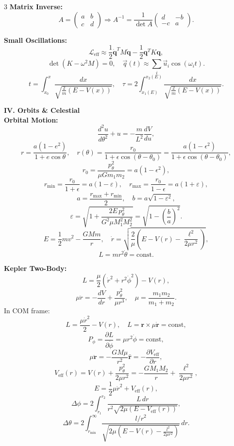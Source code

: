 \documentclass[1pt]{article}
\begin{document}
\begin{multicols}{3}
\textbf{Matrix Inverse:} 
\[
A=\begin{pmatrix} a&b\\c&d \end{pmatrix}
\Rightarrow A^{-1}=\frac{1}{\det A}\begin{pmatrix} d&-b\\-c&a \end{pmatrix}.
\]

\textbf{Small Oscillations:} 
\[
\mathcal{L}_{\text{eff}}\approx\frac{1}{2}\dot{\mathbf{q}}^T M\dot{\mathbf{q}}
-\frac{1}{2}\mathbf{q}^T K\mathbf{q},
\]
\[
\det(K-\omega^2M)=0,\quad
\vec{q}(t)\approx\sum_i\vec{u}_i\cos(\omega_it).
\]
\[
t=\int_{x_0}^{x}\frac{dx}{\sqrt{\frac{2}{m}(E-V(x))}},\quad
\tau=2\int_{x_1(E)}^{x_2(E)}\frac{dx}{\sqrt{\frac{2}{m}(E-V(x))}}.
\]

\textbf{IV. Orbits \& Celestial}\\[2pt]
\textbf{Orbital Motion:} 
\[
\frac{d^2u}{d\theta^2}+u=-\frac{m}{L^2}\frac{dV}{du},
\]
\[
r=\frac{a(1-e^2)}{1+e\cos\theta},
\quad
r(\theta)=\frac{r_0}{1+\epsilon\cos(\theta-\theta_0)}
=\frac{a(1-\epsilon^2)}{1+\epsilon\cos(\theta-\theta_0)},
\]
\[
r_0=\frac{p_\theta^2}{\mu Gm_1m_2}=a(1-\epsilon^2),
\]
\[
r_{\min}=\frac{r_0}{1+\epsilon}=a(1-\varepsilon),\quad
r_{\max}=\frac{r_0}{1-\epsilon}=a(1+\varepsilon),
\]
\[
a=\frac{r_{\max}+r_{\min}}{2},\quad b=a\sqrt{1-\varepsilon^2},
\]
\[
\varepsilon=\sqrt{1+\frac{2E\,p_\theta^2}{G^2\mu M_1^2M_2^2}}
=\sqrt{1-\left(\frac{b}{a}\right)^2}.
\]
\[
E=\frac{1}{2}mv^2-\frac{GMm}{r},\quad
\dot{r}=\sqrt{\frac{2}{\mu}\left(E-V(r)-\frac{\ell^2}{2\mu r^2}\right)},
\]
\[
L=mr^2\dot{\theta}=\text{const.}
\]

\textbf{Kepler Two-Body:} 
\[
L=\frac{\mu}{2}\left(\dot{r}^2+r^2\dot{\phi}^2\right)-V(r),
\]
\[
\mu\ddot{r}=-\frac{dV}{dr}+\frac{p_\theta^2}{\mu r^3},\quad
\mu=\frac{m_1m_2}{m_1+m_2}.
\]
In COM frame:
\[
L=\frac{\mu\dot{r}^2}{2}-V(r),
\quad
L=\mathbf{r}\times\mu\dot{\mathbf{r}}=\text{const},
\]
\[
P_\phi=\frac{\partial L}{\partial\dot{\phi}}=\mu r^2\dot{\phi}=\text{const},
\]
\[
\mu\ddot{\mathbf{r}}=-\frac{GM\mu}{r^2}\hat{\mathbf{r}}
=-\frac{\partial V_{\text{eff}}}{\partial r},
\]
\[
V_{\text{eff}}(r)=V(r)+\frac{p_\theta^2}{2\mu r^2}
=-\frac{GM_1M_2}{r}+\frac{\ell^2}{2\mu r^2},
\]
\[
E=\frac{1}{2}\mu\dot{r}^2+V_{\text{eff}}(r),
\]
\[
\Delta\phi=2\int_{r_1}^{r_2}\frac{L\,dr}{r^2\sqrt{2\mu(E-V_{\text{eff}}(r))}},
\]
\[
\Delta\theta=2\int_{r_{\min}}^{\infty}\frac{l/r^2}{\sqrt{2\mu\left(E-V(r)-\frac{l^2}{2\mu r^2}\right)}}\,dr.
\]


\end{multicols}
\end{document}
